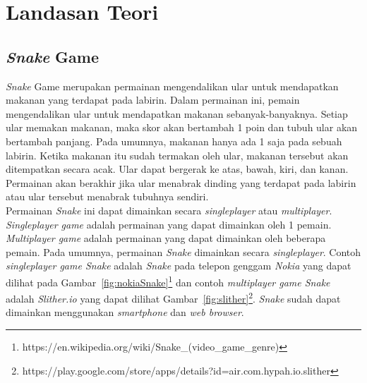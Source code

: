 \chapter{Landasan Teori}
\label{chap:teori}



\section{\textit{Snake} Game}
\label{sec:snake}
\textit{Snake} Game merupakan permainan mengendalikan ular untuk mendapatkan makanan yang terdapat pada labirin. Dalam permainan ini, pemain mengendalikan ular untuk mendapatkan makanan sebanyak-banyaknya. Setiap ular memakan makanan, maka skor akan bertambah 1 poin dan tubuh ular akan bertambah panjang. Pada umumnya, makanan hanya ada 1 saja pada sebuah labirin. Ketika makanan itu sudah termakan oleh ular, makanan tersebut akan ditempatkan secara acak. Ular dapat bergerak ke atas, bawah, kiri, dan kanan. Permainan akan berakhir jika ular menabrak dinding yang terdapat pada labirin atau ular tersebut menabrak tubuhnya sendiri. \\

Permainan \textit{Snake} ini dapat dimainkan secara \textit{singleplayer} atau \textit{multiplayer}. \textit{Singleplayer game} adalah permainan yang dapat dimainkan oleh 1 pemain. \textit{Multiplayer game} adalah permainan yang dapat dimainkan oleh beberapa pemain. Pada umumnya, permainan \textit{Snake} dimainkan secara \textit{singleplayer}. Contoh \textit{singleplayer game Snake} adalah \textit{Snake} pada telepon genggam \textit{Nokia} yang dapat dilihat pada Gambar~\ref{fig:nokiaSnake}\footnote{https://en.wikipedia.org/wiki/Snake\_(video\_game\_genre)} dan contoh \textit{multiplayer game Snake} adalah \textit{Slither.io} yang dapat dilihat Gambar~\ref{fig:slither}\footnote{https://play.google.com/store/apps/details?id=air.com.hypah.io.slither}. \textit{Snake} sudah dapat dimainkan menggunakan \textit{smartphone} dan \textit{web browser}.  

